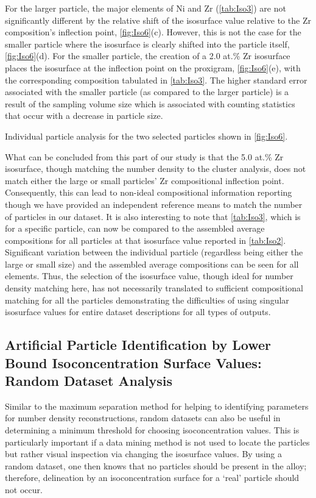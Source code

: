 		For the larger particle, the major elements of Ni and Zr (\ref{tab:Iso3}) are not significantly different by the relative shift of the isosurface value relative to the Zr composition’s inflection point, \ref{fig:Iso6}(c). However, this is not the case for the smaller particle where the isosurface is clearly shifted into the particle itself, \ref{fig:Iso6}(d). For the smaller particle, the creation of a 2.0 at.\% Zr isosurface places the isosurface at the inflection point on the proxigram, \ref{fig:Iso6}(e), with the corresponding composition tabulated in \ref{tab:Iso3}. The higher standard error associated with the smaller particle (as compared to the larger particle) is a result of the sampling volume size which is associated with counting statistics that occur with a decrease in particle size. 
		
		\begin{table}[]
			\caption{Individual particle analysis for the two selected particles shown in \ref{fig:Iso6}.}
			
			\label{tab:Iso3}
		\end{table}
		
		What can be concluded from this part of our study is that the 5.0 at.\% Zr isosurface, though matching the number density to the cluster analysis, does not match either the large or small particles’ Zr compositional inflection point. Consequently, this can lead to non-ideal compositional information reporting though we have provided an independent reference means to match the number of particles in our dataset. It is also interesting to note that \ref{tab:Iso3}, which is for a specific particle, can now be compared to the assembled average compositions for all particles at that isosurface value reported in \ref{tab:Iso2}. Significant variation between the individual particle (regardless being either the large or small size) and the assembled average compositions can be seen for all elements. Thus, the selection of the isosurface value, though ideal for number density matching here, has not necessarily translated to sufficient compositional matching for all the particles demonstrating the difficulties of using singular isosurface values for entire dataset descriptions for all types of outputs. 

	\subsection*{Artificial Particle Identification by Lower Bound Isoconcentration Surface Values: Random Dataset Analysis}
	\label{Artificial Particle Identification by Lower Bound Isoconcentration Surface Values: Random Dataset Analysis} 
		Similar to the maximum separation method for helping to identifying parameters for number density reconstructions, random datasets can also be useful in determining a minimum threshold for choosing isoconcentration values. This is particularly important if a data mining method is not used to locate the particles but rather visual inspection via changing the isosurface values.  By using a random dataset, one then knows that no particles should be present in the alloy; therefore, delineation by an isoconcentration surface for a ‘real’ particle should not occur. 
		
